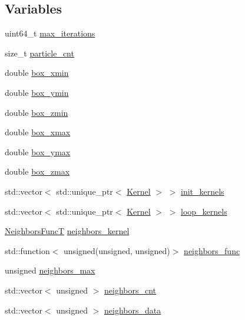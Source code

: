 \subsection*{Variables}
\begin{DoxyCompactItemize}
\item 
uint64\+\_\+t \mbox{\hyperlink{namespacewash_a7c97ecfdda83ead3747575f282914fc7}{max\+\_\+iterations}}
\item 
size\+\_\+t \mbox{\hyperlink{namespacewash_ad6aebf5344b1fc0abbba9caafc9e4148}{particle\+\_\+cnt}}
\item 
double \mbox{\hyperlink{namespacewash_a5594c5b6d88e52502a105679e9dce1e5}{box\+\_\+xmin}}
\item 
double \mbox{\hyperlink{namespacewash_a2bb279bd282b3bb57afec4eaaa7881f0}{box\+\_\+ymin}}
\item 
double \mbox{\hyperlink{namespacewash_aa81fea0809af4d84ee5cc0cde58ef23a}{box\+\_\+zmin}}
\item 
double \mbox{\hyperlink{namespacewash_ad5a717b6958f5b958fdc4095a379bbc1}{box\+\_\+xmax}}
\item 
double \mbox{\hyperlink{namespacewash_a29748bd44623020b9ccbd84f4f0873cd}{box\+\_\+ymax}}
\item 
double \mbox{\hyperlink{namespacewash_a4e905cfd39ee71265bcf49732b1c8738}{box\+\_\+zmax}}
\item 
std\+::vector$<$ std\+::unique\+\_\+ptr$<$ \mbox{\hyperlink{classwash_1_1Kernel}{Kernel}} $>$ $>$ \mbox{\hyperlink{namespacewash_ae78f9afe5afb195bb7756b8d5214079d}{init\+\_\+kernels}}
\item 
std\+::vector$<$ std\+::unique\+\_\+ptr$<$ \mbox{\hyperlink{classwash_1_1Kernel}{Kernel}} $>$ $>$ \mbox{\hyperlink{namespacewash_a5de57cfe1510fe6ee588720a6776fc13}{loop\+\_\+kernels}}
\item 
\mbox{\hyperlink{namespacewash_a8135d763bfc59fce07b49873d8af0ed6}{Neighbors\+FuncT}} \mbox{\hyperlink{namespacewash_a203a4143c9b4f10b183aaaa4ad06bbc3}{neighbors\+\_\+kernel}}
\item 
std\+::function$<$ unsigned(unsigned, unsigned)$>$ \mbox{\hyperlink{namespacewash_a30e3126cfc2ad16d213276aae000265a}{neighbors\+\_\+func}}
\item 
unsigned \mbox{\hyperlink{namespacewash_a0f37c0d27c6c9494a3955d553b540690}{neighbors\+\_\+max}}
\item 
std\+::vector$<$ unsigned $>$ \mbox{\hyperlink{namespacewash_a32772cb14a972d767ad1389cd98c5dbc}{neighbors\+\_\+cnt}}
\item 
std\+::vector$<$ unsigned $>$ \mbox{\hyperlink{namespacewash_a5d5845915575f101cad2c7f2a2ecb377}{neighbors\+\_\+data}}

\end{DoxyCompactItemize}
